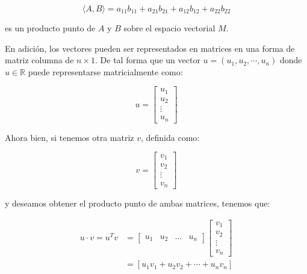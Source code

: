 \documentclass{article}
\begin{document}
    \begin{equation}
        \langle A, B\rangle=a_{11} b_{11}+a_{21} b_{21}+a_{12} b_{12}+a_{22} b_{22}
    \end{equation}

    es un producto punto de $A$ y $B$ sobre el espacio vectorial $M$.

    En adición, los vectores pueden ser representados en matrices en una forma de matriz columna de $n\times1$. De tal forma que un vector $u = (u_1, u_2, \cdots, u_n)$ donde $u \in \mathbb{R}$ puede representarse matricialmente como:

    \begin{equation}
        u=\left[\begin{array}{c}
        u_{1} \\
        u_{2} \\
        \vdots \\
        u_{n}
        \end{array}\right]
    \end{equation}

    Ahora bien, si tenemos otra matriz $v$, definida como:

    \begin{equation}
        v=\left[\begin{array}{c}
        v_{1}  \\
        v_{2}  \\
        \vdots \\
        v_{n}
        \end{array}\right]
    \end{equation}

    y deseamos obtener el producto punto de ambas matrices, tenemos que:

    \begin{equation}
        \begin{aligned}
            u \cdot v=u^{T} v &= \left[\begin{array}{llll}
            u_{1} & u_{2} & \ldots & u_{n}
            \end{array}\right]\left[\begin{array}{c}
            v_{1} \\
            v_{2} \\
            \vdots \\
            v_{n}
            \end{array}\right] \\ &= \left[u_{1} v_{1}+u_{2} v_{2}+\cdots+u_{n} v_{n}\right]
        \end{aligned}
    \end{equation}
\end{document}
